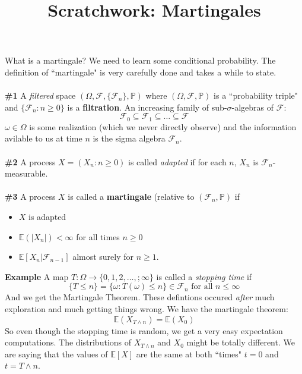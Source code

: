 \documentclass[12pt]{article}
\title{Scratchwork: Martingales}
\date{}
\begin{document}
\sffamily

\maketitle

\noindent What is a martingale?  We need to learn some conditional probability.  The definition of ``martingale" is very carefully done and takes a while to state. \\ \\
\textbf{\#\color{black!70!white}1} A \textit{filtered} space $(\Omega, \mathcal{F}, \{ \mathcal{F}_n\}, \mathbb{P})$ where $(\Omega, \mathcal{F}, \mathbb{P})$ is a ``probability triple" and $\{ \mathcal{F}_n : n \geq 0 \}$ is a \textbf{filtration}. An increasing family of sub-$\sigma$-algebras of $\mathcal{F}$:
$$ \mathcal{F}_0 \subseteq \mathcal{F}_1 \subseteq \dots \subseteq \mathcal{F} $$
$\omega \in \Omega$ is some realization (which we never directly observe) and the information avilable to us at time $n$ is the sigma algebra $\mathcal{F}_n$.  \\ \\
\textbf{\#\color{black!70!white}2} A process $X = (X_n : n \geq 0)$ is called \textit{adapted} if for each $n$, $X_n$ is $\mathcal{F}_n$-measurable. \\ \\
\textbf{\#\color{black!70!white}3} A process $X$ is called a \textbf{martingale} (relative to $(\mathcal{F}_n, \mathbb{P})$ if 
\begin{itemize}
\item $X$ is adapted
\item $\mathbb{E}(|X_n|) < \infty$ for all times $n \geq 0$
\item $\mathbb{E}[X_n | \mathcal{F}_{n-1}]$ almost surely for $n \geq 1$.
\end{itemize}
\textbf{Example} A map $T: \Omega \to \{ 0, 1, 2, \dots, ; \infty\} $ is called a \textit{stopping time} if 
$$ \{ T \leq n \} = \{ \omega: T(\omega) \leq n \} \in \mathcal{F}_n  \text{ for all } n \leq \infty $$
And we get the Martingale Theorem.  These defintions occured \textit{after} much exploration and much getting things wrong. We have the martingale theorem:
$$ \mathbb{E}(X_{T \wedge n}) = \mathbb{E}(X_0) $$
So even though the stopping time is random, we get a very easy expectation computations.  The distributions of $X_{T \wedge n}$ and $X_0$ might be totally different.  We are saying that the values of $\mathbb{E}[X]$ are the same at both ``times" $t = 0$ and $t = T \wedge n$. \\ \\
\end{document}
